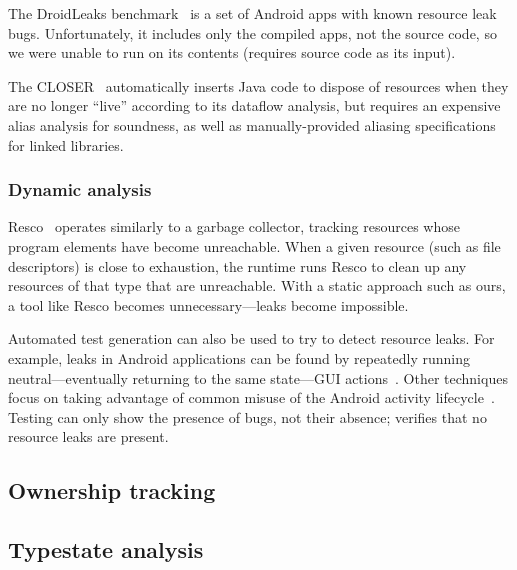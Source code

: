 The DroidLeaks benchmark~\cite{liu2019droidleaks} is a set of Android
apps with known resource leak bugs. Unfortunately, it includes only
the compiled apps, not the source code, so we were unable to run \tool
on its contents (\tool requires source code as its input).

The CLOSER~\cite{dillig2008closer} automatically inserts Java code to
dispose of resources when they are no longer ``live'' according to its
dataflow analysis, but requires an expensive alias analysis for
soundness, as well as manually-provided aliasing specifications for
linked libraries.


\subsubsection{Dynamic analysis}

Resco~\cite{dai2013resco} operates similarly to a garbage collector,
tracking resources whose program elements have become
unreachable. When a given resource (such as file descriptors) is close
to exhaustion, the runtime runs Resco to clean up any resources of
that type that are unreachable.  With a static approach such as ours,
a tool like Resco becomes unnecessary---leaks become impossible.

Automated test generation can also be used to try to detect resource
leaks. For example, leaks in Android applications can be found by
repeatedly running neutral---eventually returning to the same
state---GUI actions~\cite{wu2018sentinel,zhang2016automated}.
Other techniques focus on taking advantage of common misuse of
the Android activity lifecycle~\cite{amalfitano2020memories}.
Testing can only show the presence of bugs, not their absence;
\tool verifies that no resource leaks are present.

\subsection{Ownership tracking}



\subsection{Typestate analysis}
\label{sec:rw-typestate}

